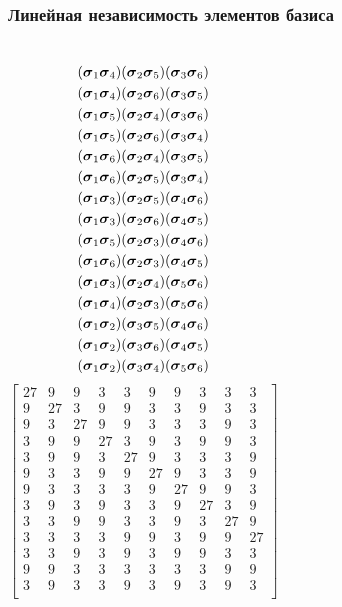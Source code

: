 \documentclass{beamer}
\begin{document}
\begin{frame}
\frametitle{Линейная независимость элементов базиса}
\tiny
\begin{columns}[c] %
$$\begin{gathered}
(\cc_1\cc_4) (\cc_2\cc_5) (\cc_3\cc_6)\\
(\cc_1\cc_4) (\cc_2\cc_6) (\cc_3\cc_5)\\
(\cc_1\cc_5) (\cc_2\cc_4) (\cc_3\cc_6)\\
(\cc_1\cc_5) (\cc_2\cc_6) (\cc_3\cc_4)\\
(\cc_1\cc_6) (\cc_2\cc_4) (\cc_3\cc_5)\\
(\cc_1\cc_6) (\cc_2\cc_5) (\cc_3\cc_4)\\
(\cc_1\cc_3) (\cc_2\cc_5) (\cc_4\cc_6)\\
(\cc_1\cc_3) (\cc_2\cc_6) (\cc_4\cc_5)\\
(\cc_1\cc_5) (\cc_2\cc_3) (\cc_4\cc_6)\\
(\cc_1\cc_6) (\cc_2\cc_3) (\cc_4\cc_5)\\
(\cc_1\cc_3) (\cc_2\cc_4) (\cc_5\cc_6)\\
(\cc_1\cc_4) (\cc_2\cc_3) (\cc_5\cc_6)\\
(\cc_1\cc_2) (\cc_3\cc_5) (\cc_4\cc_6)\\
(\cc_1\cc_2) (\cc_3\cc_6) (\cc_4\cc_5)\\
(\cc_1\cc_2) (\cc_3\cc_4) (\cc_5\cc_6)
\end{gathered}$$
$$
\begin{bmatrix}
27& 9& 9& 3& 3& 9& 9& 3& 3& 3\\
9& 27& 3& 9& 9& 3& 3& 9& 3& 3\\
9& 3& 27& 9& 9& 3& 3& 3& 9& 3\\
3& 9& 9& 27& 3& 9& 3& 9& 9& 3\\
3& 9& 9& 3& 27& 9& 3& 3& 3& 9\\
9& 3& 3& 9& 9& 27& 9& 3& 3& 9\\
9& 3& 3& 3& 3& 9& 27& 9& 9& 3\\
3& 9& 3& 9& 3& 3& 9& 27& 3& 9\\
3& 3& 9& 9& 3& 3& 9& 3& 27& 9\\
3& 3& 3& 3& 9& 9& 3& 9& 9& 27\\
3& 3& 9& 3& 9& 3& 9& 9& 3& 3\\
9& 9& 3& 3& 3& 3& 3& 3& 9& 9\\
3& 9& 3& 3& 9& 3& 9& 3& 9& 3\\

\end{bmatrix}$$
\end{columns}
\end{frame}
\end{document}
